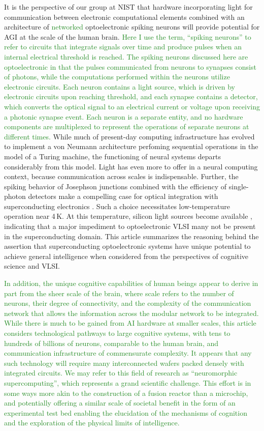 \documentclass[twocolumn]{article}
\begin{document}
It is the perspective of our group at NIST that hardware incorporating light for communication between electronic computational elements combined with an architecture of \textcolor{ForestGreen}{networked} optoelectronic spiking neurons will provide potential for AGI at the scale of the human brain. \textcolor{ForestGreen}{Here I use the term, ``spiking neurons'' to refer to circuits that integrate signals over time and produce pulses when an internal electrical threshold is reached. The spiking neurons discussed here are optoelectronic in that the pulses communicated from neurons to synapses consist of photons, while the computations performed within the neurons utilize electronic circuits. Each neuron contains a light source, which is driven by electronic circuits upon reaching threshold, and each synapse contains a detector, which converts the optical signal to an electrical current or voltage upon receiving a photonic synapse event. Each neuron is a separate entity, and no hardware components are multiplexed to represent the operations of separate neurons at different times.} While much of present-day computing infrastructure has evolved to implement a von Neumann architecture perfoming sequential operations in the model of a Turing machine, the functioning of neural systems departs considerably from this model. Light has even more to offer in a neural computing context, because communication across scales is indispensable. Further, the spiking behavior of Josephson junctions combined with the efficiency of single-photon detectors make a compelling case for optical integration with superconducting electronics \cite{shbu2017,sh2018}. Such a choice necessitates low-temperature operation near 4\,K. At this temperature, silicon light sources become available \cite{buch2017}, indicating that a major impediment to optoelectronic VLSI many not be present in the superconducting domain. This article summarizes the reasoning behind the assertion that superconducting optoelectronic systems have unique potential to achieve general intelligence when considered from the perspectives of cognitive science and VLSI.

\textcolor{ForestGreen}{In addition, the unique cognitive capabilities of human beings appear to derive in part from the sheer scale of the brain, where scale refers to the number of neurons, their degree of connectivity, and the complexity of the communication network that allows the information across the modular network to be integrated. While there is much to be gained from AI hardware at smaller scales, this article considers technological pathways to large cognitive systems, with tens to hundreds of billions of neurons, comparable to the human brain, and communication infrastructure of commensurate complexity. It appears that any such technology will require many interconnected wafers packed densely with integrated circuits. We may refer to this field of research as ``neuromorphic supercomputing'', which represents a grand scientific challenge. This effort is in some ways more akin to the construction of a fusion reactor than a microchip, and potentially offering a similar scale of societal benefit in the form of an experimental test bed enabling the elucidation of the mechanisms of cognition and the exploration of the physical limits of intelligence.}
\end{document}
